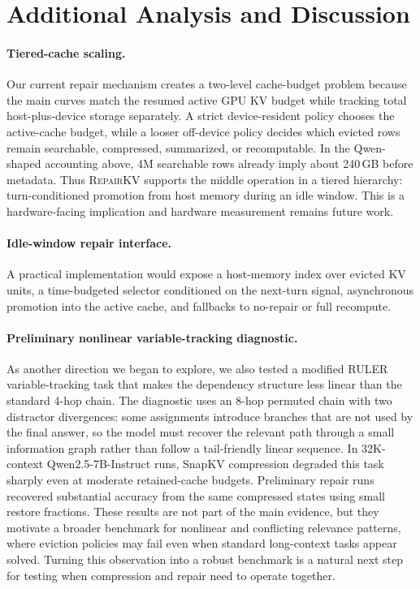 \documentclass{article}
\newcommand{\repairkv}{\textsc{RepairKV}}
\begin{document}
\section{\texorpdfstring{{Additional Analysis and Discussion}}{Additional Analysis and Discussion}}
\label{app:additional-discussion}

\paragraph{Tiered-cache scaling.}
Our current repair mechanism creates a two-level cache-budget problem because the main curves match
the resumed active GPU KV budget while tracking total host-plus-device
storage separately.
A strict device-resident policy chooses the active-cache budget, while a
looser off-device policy decides which evicted rows remain searchable,
compressed, summarized, or recomputable.
In the Qwen-shaped accounting
above, 4M searchable rows already imply about 240\,GB before metadata.
Thus \repairkv{} supports the middle operation in a tiered hierarchy:
turn-conditioned promotion from host memory during an idle window.
This is a hardware-facing implication and hardware measurement remains
future work.

\paragraph{Idle-window repair interface.}
A practical implementation would expose a host-memory index over evicted KV
units, a time-budgeted selector conditioned on the next-turn signal,
asynchronous promotion into the active cache, and fallbacks to no-repair or
full recompute.

\paragraph{Preliminary nonlinear variable-tracking diagnostic.}
\label{app:vt8hop-div2}

As another direction we began to explore, we also tested a modified RULER
variable-tracking task that makes the dependency structure less linear than the
standard 4-hop chain. The diagnostic uses an 8-hop permuted chain with two
distractor divergences: some assignments introduce branches that are not used by
the final answer, so the model must recover the relevant path through a small
information graph rather than follow a tail-friendly linear sequence. In
32K-context Qwen2.5-7B-Instruct runs, SnapKV compression degraded this task
sharply even at moderate retained-cache budgets. Preliminary repair runs
recovered substantial accuracy from the same compressed states using small
restore fractions. These results are not part of the main evidence, but they
motivate a broader benchmark for nonlinear and conflicting relevance patterns,
where eviction policies may fail even when standard long-context tasks appear
solved. Turning this observation into a robust benchmark is a natural next step
for testing when compression and repair need to operate together.
\end{document}
